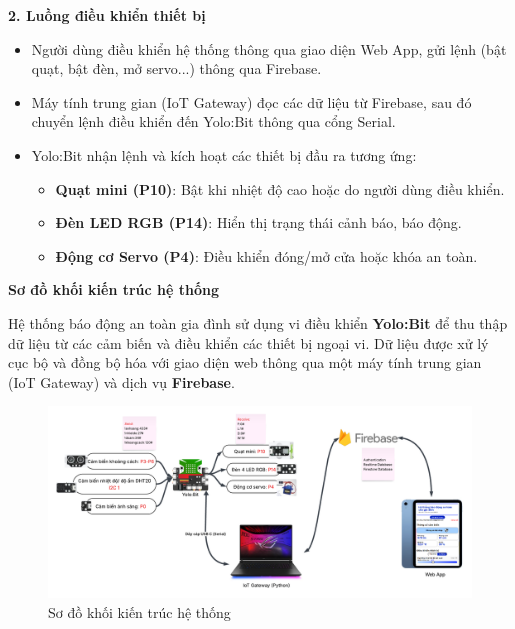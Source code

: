 \textbf{2. Luồng điều khiển thiết bị}

\begin{itemize}
    \item Người dùng điều khiển hệ thống thông qua giao diện Web App, gửi lệnh (bật quạt, bật đèn, mở servo...) thông qua Firebase.
    \item Máy tính trung gian (IoT Gateway) đọc các dữ liệu từ Firebase, sau đó chuyển lệnh điều khiển đến Yolo:Bit thông qua cổng Serial.
    \item Yolo:Bit nhận lệnh và kích hoạt các thiết bị đầu ra tương ứng:
          \begin{itemize}
              \item \textbf{Quạt mini (P10)}: Bật khi nhiệt độ cao hoặc do người dùng điều khiển.
              \item \textbf{Đèn LED RGB (P14)}: Hiển thị trạng thái cảnh báo, báo động.
              \item \textbf{Động cơ Servo (P4)}: Điều khiển đóng/mở cửa hoặc khóa an toàn.
          \end{itemize}
\end{itemize}

\textbf{Sơ đồ khối kiến trúc hệ thống}

Hệ thống báo động an toàn gia đình sử dụng vi điều khiển \textbf{Yolo:Bit} để thu thập dữ liệu từ các cảm biến và điều khiển các thiết bị ngoại vi. Dữ liệu được xử lý cục bộ và đồng bộ hóa với giao diện web thông qua một máy tính trung gian (IoT Gateway) và dịch vụ \textbf{Firebase}.

\begin{figure}[H]
    \centering
    \includegraphics[width=\textwidth]{figures/tongquan.png}
    \caption{Sơ đồ khối kiến trúc hệ thống}
    \label{fig:tongquan}
\end{figure}


